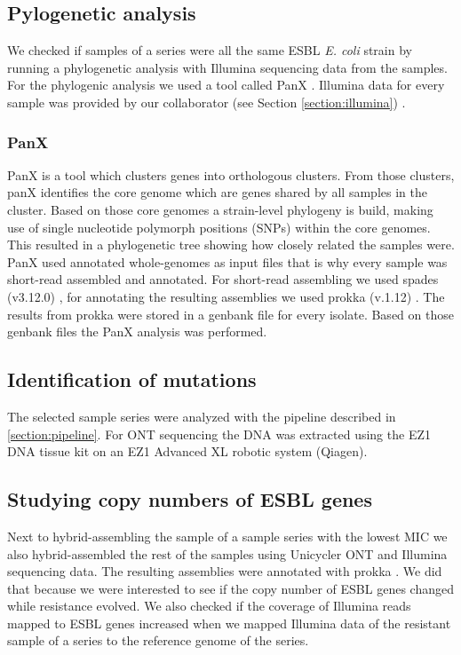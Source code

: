 \subsection{Pylogenetic analysis}
We checked if samples of a series were all the same ESBL \textit{E. coli} strain by running a phylogenetic analysis with Illumina sequencing data from the samples. For the phylogenic analysis we used a tool called PanX \cite{ding_panx:_2018}. Illumina data for every sample was provided by our collaborator (see Section \ref{section:illumina}) .

\subsubsection{PanX}
PanX is a tool which clusters genes into orthologous clusters. From those clusters, panX identifies the core genome which are genes shared by all samples in the cluster. Based on those core genomes a strain-level phylogeny is build, making use of single nucleotide polymorph positions (SNPs) within the core genomes. This resulted in a phylogenetic tree showing how closely related the samples were. \\ 
PanX used annotated whole-genomes as input files that is why every sample was short-read assembled and annotated. For short-read assembling we used spades (v3.12.0) \cite{nurk_assembling_2013}, for annotating the resulting assemblies we used prokka (v.1.12) \cite{seemann_prokka:_2014}. The results from prokka were stored in a genbank file for every isolate. Based on those genbank files the PanX analysis was performed. \\

\subsection{Identification of mutations}
The selected sample series were analyzed with the pipeline described in \ref{section:pipeline}. For ONT sequencing the DNA was extracted using the EZ1 DNA tissue kit on an EZ1 Advanced XL robotic system (Qiagen).

\subsection{Studying copy numbers of ESBL genes}
Next to hybrid-assembling the sample of a sample series with the lowest MIC we also hybrid-assembled the rest of the samples using Unicycler \cite{wick_unicycler:_2017} ONT and Illumina sequencing data. The resulting assemblies were annotated with prokka \cite{seemann_prokka:_2014}. We did that because we were interested to see if the copy number of ESBL genes changed while resistance evolved. We also checked if the coverage of Illumina reads mapped to ESBL genes increased when we mapped Illumina data of the resistant sample of a series to the reference genome of the series.

